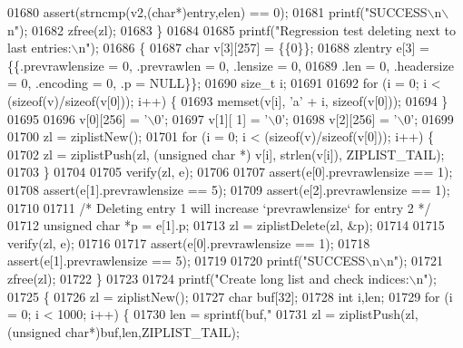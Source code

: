 \begin{DoxyCode}
{{{{{{{{{{{{{{{{{{{{{{{{{{{{01680         assert(strncmp(v2,(\textcolor{keywordtype}{char}*)entry,elen) == 0);
01681         printf(\textcolor{stringliteral}{"SUCCESS\(\backslash\)n\(\backslash\)n"});
01682         zfree(zl);
01683     \}
01684 
01685     printf(\textcolor{stringliteral}{"Regression test deleting next to last entries:\(\backslash\)n"});
01686     \{
01687         \textcolor{keywordtype}{char} v[3][257] = \{\{0\}\};
01688         zlentry e[3] = \{\{.prevrawlensize = 0, .prevrawlen = 0, .lensize = 0,
01689                          .len = 0, .headersize = 0, .encoding = 0, .p = NULL\}\};
01690         size\_t i;
01691 
01692         \textcolor{keywordflow}{for} (i = 0; i < (\textcolor{keyword}{sizeof}(v)/\textcolor{keyword}{sizeof}(v[0])); i++) \{
01693             memset(v[i], \textcolor{stringliteral}{'a'} + i, \textcolor{keyword}{sizeof}(v[0]));
01694         \}
01695 
01696         v[0][256] = \textcolor{stringliteral}{'\(\backslash\)0'};
01697         v[1][  1] = \textcolor{stringliteral}{'\(\backslash\)0'};
01698         v[2][256] = \textcolor{stringliteral}{'\(\backslash\)0'};
01699 
01700         zl = ziplistNew();
01701         \textcolor{keywordflow}{for} (i = 0; i < (\textcolor{keyword}{sizeof}(v)/\textcolor{keyword}{sizeof}(v[0])); i++) \{
01702             zl = ziplistPush(zl, (\textcolor{keywordtype}{unsigned} \textcolor{keywordtype}{char} *) v[i], strlen(v[i]), ZIPLIST\_TAIL);
01703         \}
01704 
01705         verify(zl, e);
01706 
01707         assert(e[0].prevrawlensize == 1);
01708         assert(e[1].prevrawlensize == 5);
01709         assert(e[2].prevrawlensize == 1);
01710 
01711         \textcolor{comment}{/* Deleting entry 1 will increase `prevrawlensize` for entry 2 */}
01712         \textcolor{keywordtype}{unsigned} \textcolor{keywordtype}{char} *p = e[1].p;
01713         zl = ziplistDelete(zl, &p);
01714 
01715         verify(zl, e);
01716 
01717         assert(e[0].prevrawlensize == 1);
01718         assert(e[1].prevrawlensize == 5);
01719 
01720         printf(\textcolor{stringliteral}{"SUCCESS\(\backslash\)n\(\backslash\)n"});
01721         zfree(zl);
01722     \}
01723 
01724     printf(\textcolor{stringliteral}{"Create long list and check indices:\(\backslash\)n"});
01725     \{
01726         zl = ziplistNew();
01727         \textcolor{keywordtype}{char} buf[32];
01728         \textcolor{keywordtype}{int} i,len;
01729         \textcolor{keywordflow}{for} (i = 0; i < 1000; i++) \{
01730             len = sprintf(buf,\textcolor{stringliteral}{"%
01731             zl = ziplistPush(zl,(\textcolor{keywordtype}{unsigned} \textcolor{keywordtype}{char}*)buf,len,ZIPLIST\_TAIL);
}}}}}}}}}}}}}}}}}}}}}}}}}}}}}
\end{DoxyCode}
